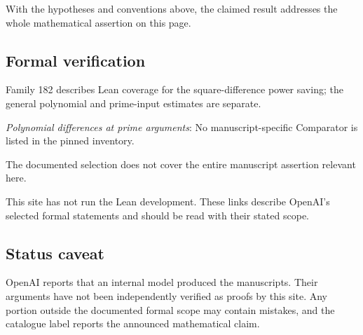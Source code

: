 \documentclass[11pt]{article}
\begin{document}
With the hypotheses and conventions above, the claimed result addresses the whole mathematical assertion on this page.

\subsection{Formal verification}
Family 182 describes Lean coverage for the square-difference power saving; the general polynomial and prime-input estimates are separate.

\textit{Polynomial differences at prime arguments}: No manuscript-specific Comparator is listed in the pinned inventory.

The documented selection does not cover the entire manuscript assertion relevant here.

This site has not run the Lean development. These links describe OpenAI’s selected formal statements and should be read with their stated scope.

\subsection{Status caveat}
OpenAI reports that an internal model produced the manuscripts. Their arguments have not been independently verified as proofs by this site. Any portion outside the documented formal scope may contain mistakes, and the catalogue label reports the announced mathematical claim.
\end{document}
